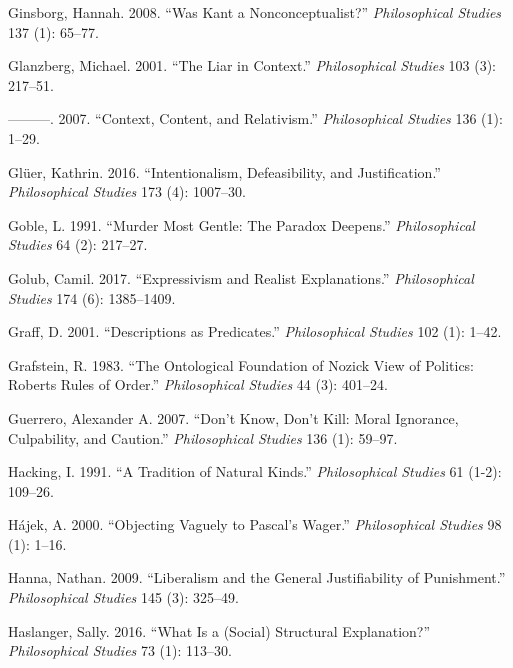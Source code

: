 \documentclass[
  10pt,
  letterpaper,
  DIV=11,
  numbers=noendperiod,
  twoside]{scrartcl}
\newlength{\cslhangindent}
\newenvironment{CSLReferences}[2] %
 {\begin{list}{}{%
  \setlength{\itemindent}{0pt}
  \setlength{\leftmargin}{0pt}
  \setlength{\parsep}{0pt}
  \ifodd #1
   \setlength{\leftmargin}{\cslhangindent}
   \setlength{\itemindent}{-1\cslhangindent}
  \fi
  \setlength{\itemsep}{#2\baselineskip}}}
 {\end{list}}
\begin{document}
\begin{CSLReferences}{1}{0}
Ginsborg, Hannah. 2008. {``Was Kant a Nonconceptualist?''}
\emph{Philosophical Studies} 137 (1): 65--77.

Glanzberg, Michael. 2001. {``The Liar in Context.''} \emph{Philosophical
Studies} 103 (3): 217--51.

---------. 2007. {``Context, Content, and Relativism.''}
\emph{Philosophical Studies} 136 (1): 1--29.

Glüer, Kathrin. 2016. {``Intentionalism, Defeasibility, and
Justification.''} \emph{Philosophical Studies} 173 (4): 1007--30.

Goble, L. 1991. {``Murder Most Gentle: The Paradox Deepens.''}
\emph{Philosophical Studies} 64 (2): 217--27.

Golub, Camil. 2017. {``Expressivism and Realist Explanations.''}
\emph{Philosophical Studies} 174 (6): 1385--1409.

Graff, D. 2001. {``Descriptions as Predicates.''} \emph{Philosophical
Studies} 102 (1): 1--42.

Grafstein, R. 1983. {``The Ontological Foundation of Nozick View of
Politics: Roberts Rules of Order.''} \emph{Philosophical Studies} 44
(3): 401--24.

Guerrero, Alexander A. 2007. {``Don't Know, Don't Kill: Moral Ignorance,
Culpability, and Caution.''} \emph{Philosophical Studies} 136 (1):
59--97.

Hacking, I. 1991. {``A Tradition of Natural Kinds.''}
\emph{Philosophical Studies} 61 (1-2): 109--26.

Hájek, A. 2000. {``Objecting Vaguely to Pascal's Wager.''}
\emph{Philosophical Studies} 98 (1): 1--16.

Hanna, Nathan. 2009. {``Liberalism and the General Justifiability of
Punishment.''} \emph{Philosophical Studies} 145 (3): 325--49.

Haslanger, Sally. 2016. {``What Is a (Social) Structural Explanation?''}
\emph{Philosophical Studies} 73 (1): 113--30.


\end{CSLReferences}
\end{document}
